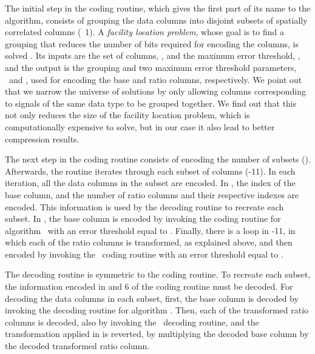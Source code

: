 \vspace{-5pt}



The initial step in the coding routine, which gives the first part of its name to the algorithm, consists of grouping the data columns into disjoint subsets of spatially correlated columns (\Line~1). A \textit{facility location problem}, whose goal is to find a grouping that reduces the number of bits required for encoding the columns, is solved \cite{coder:gamps}. Its inputs are the set of columns, \columns, and the maximum error threshold, \maxerror, and the output is the grouping and two maximum error threshold parameters, \epsilonB\ and \epsilonR, used for encoding the base and ratio columns, respectively. We point out that we narrow the universe of solutions by only allowing columns corresponding to signals of the same data type to be grouped together. We find out that this not only reduces the size of the facility location problem, which is computationally expensive to solve, but in our case it also lead to better compression results. 


The next step in the coding routine consists of encoding the number of subsets (). Afterwards, the routine iterates through each subset of columns (-11). In each iteration, all the data columns in the subset are encoded. In , the index of the base column, and the number of ratio columns and their respective indexes are encoded. This information is used by the decoding routine to recreate each subset. In , the base column is encoded by invoking the coding routine for algorithm \apcaF\ with an error threshold equal to \epsilonB. Finally, there is a loop in -11, in which each of the ratio columns is transformed, as explained above, and then encoded by invoking the \apcaF\ coding routine with an error threshold equal to \epsilonR.


The decoding routine is symmetric to the coding routine. To recreate each subset, the information encoded in  and 6 of the coding routine must be decoded. For decoding the data columns in each subset, first, the base column is decoded by invoking the decoding routine for algorithm \apcaF. Then, each of the transformed ratio columns is decoded, also by invoking the \apcaF\ decoding routine, and the transformation applied in  is reverted, by multiplying the decoded base column by the decoded transformed ratio column.




